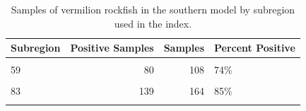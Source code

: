 \documentclass[11pt,
  english,
]{article}
\begin{document}
\newpage

\begin{table}

\caption{\label{tab:tab-region-mrfss}Samples of vermilion rockfish in the southern model by subregion used in the index.}
\centering
\begin{tabular}[t]{lrrl}
\toprule
Subregion & Positive Samples & Samples & Percent Positive\\
\midrule
\cellcolor{gray!6}{37} & \cellcolor{gray!6}{163} & \cellcolor{gray!6}{242} & \cellcolor{gray!6}{67\%}\\
59 & 80 & 108 & 74\%\\
\cellcolor{gray!6}{73} & \cellcolor{gray!6}{131} & \cellcolor{gray!6}{209} & \cellcolor{gray!6}{63\%}\\
83 & 139 & 164 & 85\%\\
\cellcolor{gray!6}{111} & \cellcolor{gray!6}{217} & \cellcolor{gray!6}{320} & \cellcolor{gray!6}{68\%}\\
\bottomrule
\end{tabular}
\end{table}
\end{document}
